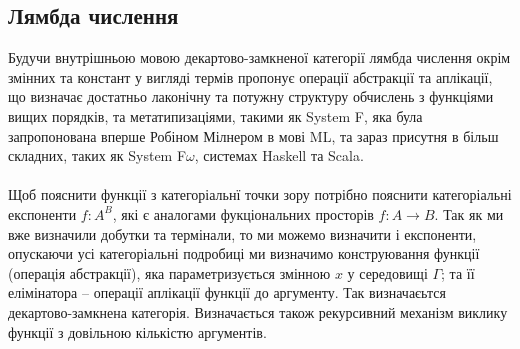 \documentclass[11pt,oneside]{article}
\begin{document}
\newpage

    \subsection{Лямбда числення}
    Будучи внутрішньою мовою декартово-замкненої категорії лямбда числення окрім змінних
    та констант у вигляді термів пропонує операції абстракції та аплікації, що визначає
    достатньо лаконічну та потужну структуру обчислень з функціями вищих порядків,
    та метатипизаціями, такими як System F, яка була запропонована
    вперше Робіном Мілнером в мові ML, та зараз присутня в більш складних,
    таких як System F$\omega$, системах Haskell та Scala.

    \paragraph{}
    Щоб пояснити функції з категоріальнї точки зору потрібно пояснити категоріальні
    експоненти $f : A^B$,  які є аналогами фукціональних просторів $f: A \rightarrow B$.
    Так як ми вже визначили добутки та термінали, то ми можемо визначити і експоненти,
    опускаючи усі категоріальні подробиці ми визначимо конструювання функції (операція абстракції),
    яка параметризується змінною $x$ у середовищі $\Gamma$; та її елімінатора -- операції аплікації
    функції до аргументу. Так визначаєьтся декартово-замкнена категорія.
    Визначається також рекурсивний механізм виклику функції
    з довільною кількістю аргументів.
\end{document}

